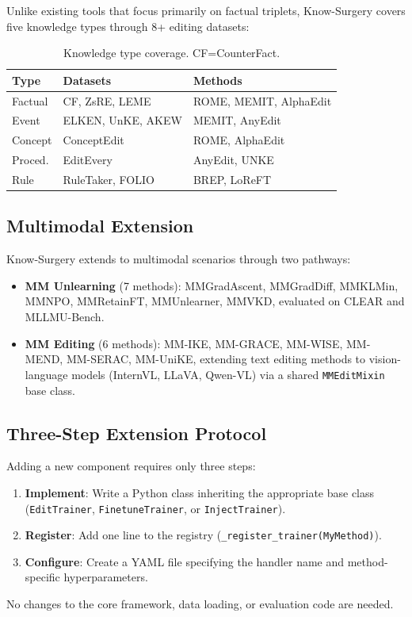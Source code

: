 Unlike existing tools that focus primarily on factual triplets, Know-Surgery covers five knowledge types through 8+ editing datasets:

\begin{table}[t]
\centering
\small
\setlength{\tabcolsep}{2pt}
\begin{tabular}{@{}lp{2.6cm}p{2.8cm}@{}}
\toprule
\textbf{Type} & \textbf{Datasets} & \textbf{Methods} \\
\midrule
Factual & CF, ZsRE, LEME & ROME, MEMIT, AlphaEdit \\
Event & ELKEN, UnKE, AKEW & MEMIT, AnyEdit \\
Concept & ConceptEdit & ROME, AlphaEdit \\
Proced. & EditEvery & AnyEdit, UNKE \\
Rule & RuleTaker, FOLIO & BREP, LoReFT \\
\bottomrule
\end{tabular}
\caption{Knowledge type coverage. CF=CounterFact.}
\label{tab:knowledge}
\end{table}

\subsection{Multimodal Extension}

Know-Surgery extends to multimodal scenarios through two pathways:
\begin{itemize}
\setlength\itemsep{0pt}
\item \textbf{MM Unlearning} (7 methods): MMGradAscent, MMGradDiff, MMKLMin, MMNPO, MMRetainFT, MMUnlearner, MMVKD, evaluated on CLEAR and MLLMU-Bench.
\item \textbf{MM Editing} (6 methods): MM-IKE, MM-GRACE, MM-WISE, MM-MEND, MM-SERAC, MM-UniKE, extending text editing methods to vision-language models (InternVL, LLaVA, Qwen-VL) via a shared \texttt{MMEditMixin} base class.
\end{itemize}

\subsection{Three-Step Extension Protocol}

Adding a new component requires only three steps:
\begin{enumerate}
\setlength\itemsep{0pt}
\item \textbf{Implement}: Write a Python class inheriting the appropriate base class (\texttt{EditTrainer}, \texttt{FinetuneTrainer}, or \texttt{InjectTrainer}).
\item \textbf{Register}: Add one line to the registry (\texttt{\_register\_trainer(MyMethod)}).
\item \textbf{Configure}: Create a YAML file specifying the handler name and method-specific hyperparameters.
\end{enumerate}
No changes to the core framework, data loading, or evaluation code are needed.
